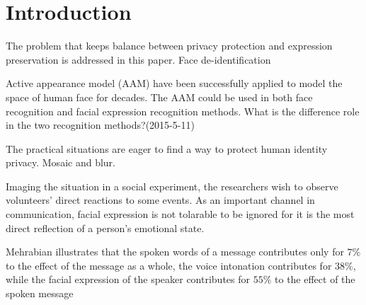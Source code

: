 
\chapter{Introduction}

The problem that keeps balance between privacy protection and expression preservation is addressed in this paper. 
Face de-identification 

\par
Active appearance model (AAM) have been successfully applied to model the space of human face for decades. The AAM could be used in both face recognition and facial expression recognition methods. What is the difference role in the two recognition methods?(2015-5-11)

\par
The practical situations are eager to find a way to protect human identity privacy. Mosaic and blur.

\par
Imaging the situation in a social experiment, the researchers wish to observe volunteers' direct reactions to some events. As an important channel in communication, facial expression is not tolarable to be ignored for it is the most direct reflection of a person's emotional state. 

\par
Mehrabian illustrates that the spoken words of a message contributes only for $7\%$ to the effect of the message as a whole, the voice intonation contributes for $38\%$, while the facial expression of the speaker contributes for $55\%$ to the effect of the spoken message ~\cite{Meh68}